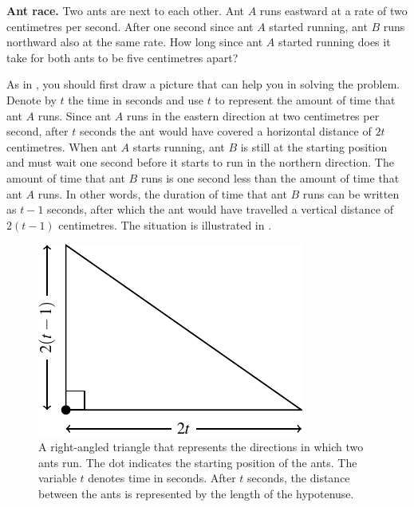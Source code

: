 \documentclass[a4paper,oneside,12pt]{article}
\begin{document}
\begin{example}
\label{ex:running_ants}
\textbf{Ant race.}
Two ants are next to each other.  Ant $A$ runs eastward at a rate of
two centimetres per second.  After one second since ant $A$ started
running, ant $B$ runs northward also at the same rate.  How long since
ant $A$ started running does it take for both ants to be five
centimetres apart?
\end{example}

\begin{solution}
As in , you should first draw a
picture that can help you in solving the problem.  Denote by $t$ the
time in seconds and use $t$ to represent the amount of time that ant
$A$ runs.  Since ant $A$ runs in the eastern direction at two
centimetres per second, after $t$ seconds the ant would have covered a
horizontal distance of $2t$ centimetres.  When ant $A$ starts running,
ant $B$ is still at the starting position and must wait one second
before it starts to run in the northern direction.  The amount of time
that ant $B$ runs is one second less than the amount of time that ant
$A$ runs.  In other words, the duration of time that ant $B$ runs can
be written as $t - 1$ seconds, after which the ant would have
travelled a vertical distance of $2(t - 1)$ centimetres.  The
situation is illustrated in .

\begin{figure}[!htbp]
\centering
\includegraphics[scale=1.2]{image/09/running-ants.pdf}
\caption{%
  A right-angled triangle that represents the directions in which two
  ants run.  The dot indicates the starting position of the ants.  The
  variable $t$ denotes time in seconds.  After $t$ seconds, the
  distance between the ants is represented by the length of the
  hypotenuse.
}
\label{fig:running_ants_triangle}
\end{figure}


\end{solution}
\end{document}
